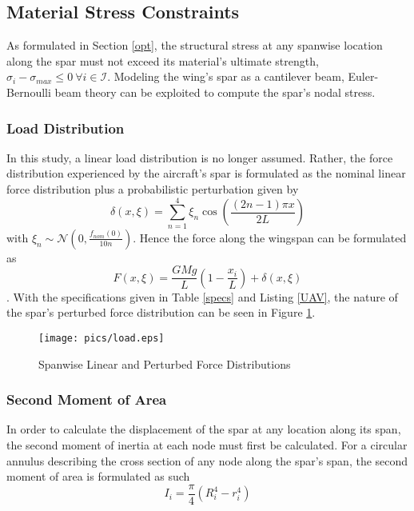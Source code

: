 \documentclass{article}
\begin{document}
\subsection{Material Stress Constraints}
As formulated in Section \ref{opt}, the structural stress at any spanwise location along the spar must not exceed its material's ultimate strength, $\sigma_i - \sigma_{max} \leq 0 ~ \forall i \in \mathcal{I}$. Modeling the wing's spar as a cantilever beam, Euler-Bernoulli beam theory can be exploited to compute the spar's nodal stress.

\subsubsection{Load Distribution}\label{load}
In this study, a linear load distribution is no longer assumed. Rather, the force distribution experienced by the aircraft's spar is formulated as the nominal linear force distribution plus a probabilistic perturbation given by $$\delta(x,\xi)=\sum_{n=1}^{4}\xi_n\cos\left(\frac{(2n-1)\pi x}{2L}\right)$$ with $\xi_n\sim\mathcal{N}\left(0,\frac{f_{nom}(0)}{10n}\right)$. Hence the force along the wingspan can be formulated as 
$$ F(x,\xi) = \frac{GMg}{L} \left ( 1-\frac{x_i}{L} \right) + \delta(x,\xi)$$.
With the specifications given in Table \ref{specs} and Listing \ref{UAV}, the nature of the spar's perturbed force distribution can be seen in Figure \ref{fig:force}.

\begin{figure}
    \caption{Spanwise Linear and Perturbed Force Distributions}
    \centering
    \texttt{[image: pics/load.eps]}
    \label{fig:force}
\end{figure}

\subsubsection{Second Moment of Area}
In order to calculate the displacement of the spar at any location along its span, the second moment of inertia at each node must first be calculated. For a circular annulus describing the cross section of any node along the spar's span, the second moment of area is formulated as such
$$ I_i = \frac{\pi}{4} \left ( R_i^4 - r_i^4 \right )$$
\end{document}

